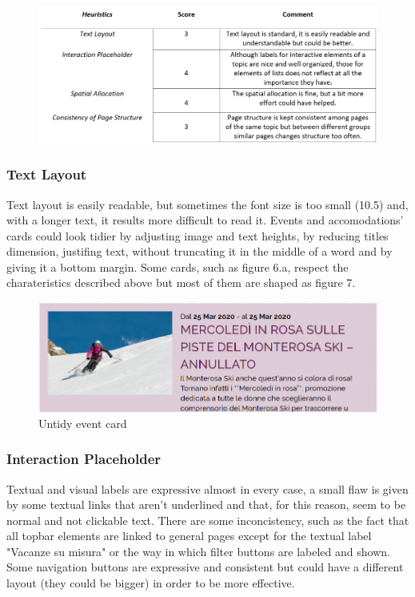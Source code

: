 \begin{figure}[h!]
	\centering
	\begin{minipage}[b]{1\textwidth}
    		\includegraphics[width=\textwidth]{./assets/layout-final.PNG}
	\end{minipage}
\end{figure}
\FloatBarrier

\subsubsection{Text Layout}
Text layout is easily readable, but sometimes the font size is too small (10.5) and, with a longer text, it results more difficult to read it. Events and accomodations' cards could look tidier by adjusting image and text heights, by reducing titles dimension, justifing text, without truncating it in the middle of a word and by giving it a bottom margin. Some cards, such as figure 6.a, respect the charateristics described above but most of them are shaped as figure 7.

\begin{figure}[h!]
	\centering
	\begin{minipage}[b]{1\textwidth}
    		\includegraphics[width=\textwidth]{./assets/event.png}
		\caption{Untidy event card}
	\end{minipage}
\end{figure}
\FloatBarrier

\subsubsection{Interaction Placeholder}
Textual and visual labels are expressive almost in every case, a small flaw is given by some textual links that aren't underlined and that, for this reason, seem to be normal and not clickable text. There are some inconcistency, such as the fact that all topbar elements are linked to general pages except for the textual label "Vacanze su misura" or the way in which filter buttons are labeled and shown. Some navigation buttons are expressive and consistent but could have a different layout (they could be bigger) in order to be more effective.

